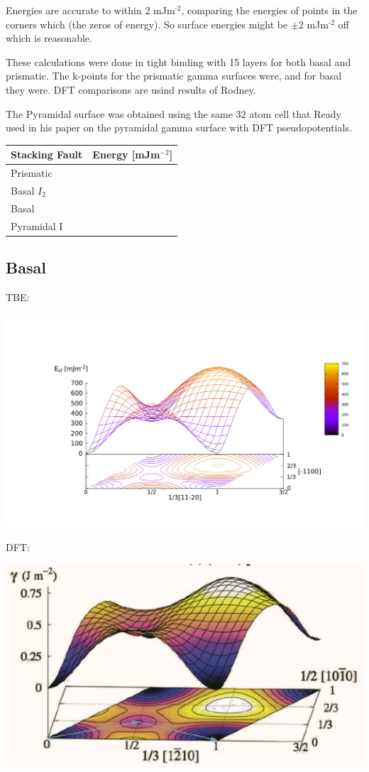 \documentclass[11pt]{article}
\begin{document}
Energies are accurate to within 2 mJm\(^{\text{-2}}\), comparing the energies of
points in the corners which (the zeros of energy). So surface energies
might be \(\pm 2\) mJm\(^{\text{-2}}\) off which is reasonable. 

These calculations were done in tight binding with 15 layers for both
basal and prismatic. The k-points for the prismatic gamma surfaces were, and for basal they were. 
DFT comparisons are usind results of Rodney. 

The Pyramidal surface was obtained using the same 32 atom cell that
Ready used in his paper on the pyramidal gamma surface with DFT
pseudopotentials. 

\begin{center}
\begin{tabular}{ll}
Stacking Fault & Energy [mJm\(^{-2}\)]\\
\hline
Prismatic & \\
Basal \(I_2\) & \\
Basal & \\
Pyramidal I & \\
\end{tabular}
\end{center}

\newpage
\subsection{Basal}
\label{sec:orgda5675c}

TBE:
\begin{center}
\includegraphics[width=.9\linewidth]{Images/basal_gamma_surface_final_model_2020-01-15.png}
\end{center}


DFT:
\begin{center}
\includegraphics[width=.9\linewidth]{Images/rodney_basal_ti_gamma_surface.png}
\end{center}
\end{document}
